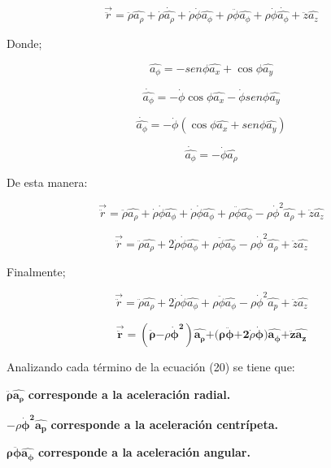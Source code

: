 \documentclass[]{article}
\begin{document}
\[\overrightarrow{\ddot{r}} = \ddot{\rho}\widehat{a_{\rho}} + \dot{\rho}\dot{\widehat{a_{\rho}}} + \dot{\rho}\dot{\phi}\widehat{a_{\phi}} + \rho\ddot{\phi}\widehat{a_{\phi}} + \rho\dot{\phi}\dot{\widehat{a_{\phi}}} + \ddot{z}\widehat{a_{z}}\]

Donde;

\[\widehat{a_{\phi}} = - {sen}\phi\widehat{a_{x}} + \cos\phi\widehat{a_{y}}\]

\[\dot{\widehat{a_{\phi}}} = - \dot{\phi}\cos\phi\widehat{a_{x}} - \dot{\phi}{sen}\phi\widehat{a_{y}}\]

\[\dot{\widehat{a_{\phi}}} = - \dot{\phi}(\cos\phi\widehat{a_{x}} + {sen}\phi\widehat{a_{y}})\]

\[\dot{\widehat{a_{\phi}}} = - \dot{\phi}\widehat{a_{\rho}}\]

De esta manera:

\[\overrightarrow{\ddot{r}} = \ddot{\rho}\widehat{a_{\rho}} + \dot{\rho}\dot{\phi}\widehat{a_{\phi}} + \dot{\rho}\dot{\phi}\widehat{a_{\phi}} + \rho\ddot{\phi}\widehat{a_{\phi}} - \rho{\dot{\phi}}^{2}\widehat{a_{\rho}} + \ddot{z}\widehat{a_{z}}\]

\[\overrightarrow{\ddot{r}} = \ddot{\rho}\widehat{a_{\rho}} + 2\dot{\rho}\dot{\phi}\widehat{a_{\phi}} + \rho\ddot{\phi}\widehat{a_{\phi}} - \rho{\dot{\phi}}^{2}\widehat{a_{\rho}} + \ddot{z}\widehat{a_{z}}\]

Finalmente;

\[\overrightarrow{\ddot{r}} = \ddot{\rho}\widehat{a_{\rho}} + 2\dot{\rho}\dot{\phi}\widehat{a_{\phi}} + \rho\ddot{\phi}\widehat{a_{\phi}} - \rho{\dot{\phi}}^{2}\widehat{a_{p}} + \ddot{z}\widehat{a_{z}}\]

\[\overrightarrow{\ddot{\mathbf{r}}}\mathbf{=}\left( \ddot{\mathbf{\rho}}\mathbf{-}\rho{\dot{\mathbf{\phi}}}^{\mathbf{2}} \right)\widehat{\mathbf{a}_{\mathbf{\rho}}}\mathbf{+ (\rho}\ddot{\mathbf{\phi}}\mathbf{+ 2}\dot{\rho}\dot{\mathbf{\phi}}\mathbf{)}\widehat{\mathbf{a}_{\mathbf{\phi}}}\mathbf{+}\ddot{\mathbf{z}}\widehat{\mathbf{a}_{\mathbf{z}}}\]

Analizando cada término de la ecuación (20) se tiene que:

\(\ddot{\mathbf{\rho}}\widehat{\mathbf{a}_{\mathbf{\rho}}}\)
\textbf{corresponde a la aceleración radial.}

\(\mathbf{-}\rho{\dot{\mathbf{\phi}}}^{\mathbf{2}}\widehat{\mathbf{a}_{\mathbf{p}}}\)
\textbf{corresponde a la aceleración centrípeta.}

\(\mathbf{\rho}\ddot{\mathbf{\phi}}\widehat{\mathbf{a}_{\mathbf{\phi}}}\)
\textbf{corresponde a la aceleración angular.}
\end{document}
